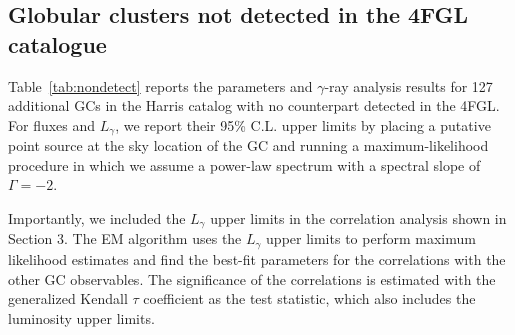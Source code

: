 \documentclass[doublespace,draft,nopageskip]{VTthesis} %
\begin{document}
\appendix

\begin{appendices}

  
  \chapter{} \label{app:A}

  \section{Globular clusters not detected in the 4FGL catalogue}\label{appx:nodetect}

  Table~\ref{tab:nondetect} reports the parameters and $\gamma$-ray analysis results for 127 additional GCs in the Harris catalog with no counterpart detected in the 4FGL. For fluxes and $L_\gamma$, we report their 95\% C.L. upper limits by placing a putative point source at the sky location of the GC and running a maximum-likelihood procedure in which we assume a power-law spectrum with a spectral slope of $\Gamma = -2$.

  Importantly, we included the $L_\gamma$ upper limits in the correlation analysis shown in Section 3. The EM algorithm uses the $L_\gamma$ upper limits to perform maximum likelihood estimates and find the best-fit parameters for the correlations with the other GC observables. The significance of the correlations is estimated with the generalized Kendall $\tau$ coefficient as the test statistic, which also includes the luminosity upper limits. 


\end{appendices}
\end{document}
